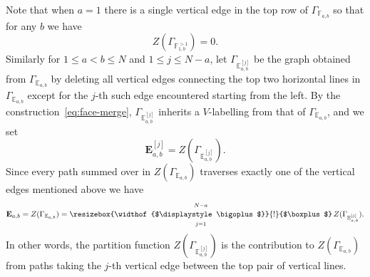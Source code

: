 \documentclass[11pt, reqno]{amsart}
\theoremstyle{definition}
\numberwithin{equation}{section}
\def\stgE{\mathbf{E}}
\newcommand{\boxsum}{
  \mathop{
    \vphantom{\bigoplus} 
    \mathchoice
      {\vcenter{\hbox{\resizebox{\widthof{$\displaystyle\bigoplus$}}{!}{$\boxplus$}}}}
      {\vcenter{\hbox{\resizebox{\widthof{$\bigoplus$}}{!}{$\boxplus$}}}}
      {\vcenter{\hbox{\resizebox{\widthof{$\scriptstyle\oplus$}}{!}{$\boxplus$}}}}
      {\vcenter{\hbox{\resizebox{\widthof{$\scriptscriptstyle\oplus$}}{!}{$\boxplus$}}}}
  }\displaylimits 
}
\begin{document}
Note that when $a=1$ there is a single vertical edge in the top row of $\Gamma_{\mathbb{F}_{a,b}}$ so that for any $b$ we have
$$
Z({\Gamma_{{\mathbb{F}^{>1}_{1,b}}}})=0.
$$
Similarly for $1\leq a<b\leq N$ and $1\leq j\leq N-a$, let $\Gamma_{{\mathbb{E}^{[j]}_{a,b}}}$ be the graph obtained from $\Gamma_{{\mathbb{E}_{a,b}}}$  by deleting all vertical edges connecting the top two horizontal lines in $\Gamma_{{\mathbb{E}_{a,b}}}$ except for the $j$-th such edge encountered starting from the left. By the construction~\eqref{eq:face-merge}, $\Gamma_{{\mathbb{E}^{[j]}_{a,b}}}$ inherits a $V$-labelling from that of $\Gamma_{{\mathbb{E}_{a,b}}}$, and we set
$$
\stgE^{[j]}_{a,b} = Z({\Gamma_{{\mathbb{E}^{[j]}_{a,b}}}}).
$$
Since every path summed over in $Z({\Gamma_{{\mathbb{E}_{a,b}}}})$ traverses exactly one of the vertical edges mentioned above we have
$$
\stgE_{a,b} = Z(\Gamma_{{\mathbb{E}_{a,b}}}) = \boxsum_{j=1}^{N-a}Z(\Gamma_{{\mathbb{E}^{[j]}_{a,b}}}).
$$
In other words, the partition function $Z(\Gamma_{{\mathbb{E}^{[j]}_{a,b}}})$ is the contribution to $Z(\Gamma_{{\mathbb{E}_{a,b}}})$ from paths taking the $j$-th vertical edge between the top pair of vertical lines. 
\end{document}

